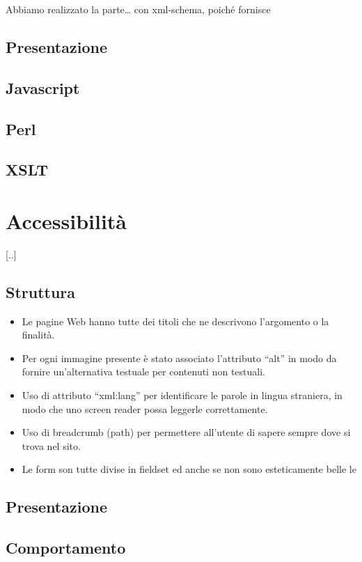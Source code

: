\documentclass[12pt]{article}
\begin{document}
	Abbiamo realizzato la parte… con xml-schema, poiché fornisce

	\subsection{Presentazione}
	\subsection{Javascript}
	\subsection{Perl}
	\subsection{XSLT}


\section{Accessibilità}
[..]
	\subsection{Struttura}
	\begin{itemize}
	\item Le pagine Web hanno tutte dei titoli che ne descrivono l’argomento o la finalità.
	\item Per ogni immagine presente è stato associato l'attributo “alt” in modo da fornire un’alternativa testuale per contenuti non testuali.
	\item Uso di attributo “xml:lang” per identificare le parole in lingua straniera, in modo che uno screen reader possa leggerle correttamente.
	\item Uso di breadcrumb (path) per permettere all’utente di sapere sempre dove si trova nel sito.
	\item Le form son tutte divise in fieldset ed anche se non sono esteticamente belle le
	\end{itemize}

	\subsection{Presentazione}

	\subsection{Comportamento}
\end{document}

